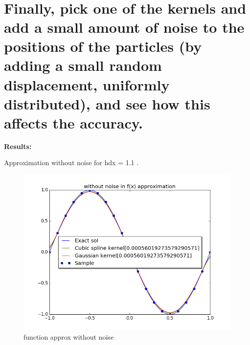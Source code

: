 \documentclass[a4paper,11pt]{article}
\begin{document}
\newpage
\indent\\
\newpage
\indent\\
\newpage
\indent\\
\newpage
\indent\\
\newpage
\indent\\
\newpage
\indent\\

\section{Finally, pick one of the kernels and add a small amount of noise to the positions of the particles (by adding a small random displacement, uniformly distributed), and see how this affects the accuracy.}

\textbf{Results:}

\indent Approximation without noise for hdx = 1.1 .
\begin{figure}[ht]
    \centering
    \includegraphics[width=.8\linewidth]{nnoise.png}
    \caption{function approx without noise}
    \label{fig:ex11}    
\end{figure}
\end{document}
